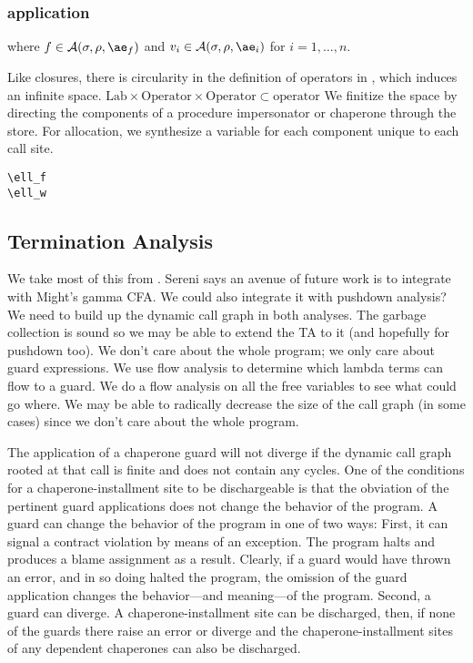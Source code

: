 \documentclass{sigplanconf}
\begin{document}
\subsubsection{application}

\noindent
{}

\noindent
where $f\in\A{\sigma}{\rho}{\ae_f}$ and $v_i\in\A{\sigma}{\rho}{\ae_i}$ for $i=1,\dots,n$.

Like closures, there is circularity in the definition of operators in \chapcalc, which induces an infinite space.
$\mathrm{Lab}\times\mathrm{Operator}\times\mathrm{Operator}\subset\mathrm{operator}$
We finitize the space by directing the components of a procedure impersonator or chaperone through the store.
For allocation, we synthesize a variable for each component unique to each call site.
\begin{verbatim}
\ell_f
\ell_w
\end{verbatim}

\subsection{Termination Analysis}

We take most of this from \cite{sereni2007termination}.
Sereni says an avenue of future work is to integrate with Might's gamma CFA.
We could also integrate it with pushdown analysis?
We need to build up the dynamic call graph in both analyses.
The garbage collection is sound so we may be able to extend the TA to it (and hopefully for pushdown too).
We don't care about the whole program; we only care about guard expressions.
We use flow analysis to determine which lambda terms can flow to a guard.
We do a flow analysis on all the free variables to see what could go where.
We may be able to radically decrease the size of the call graph (in some cases) since we don't care about the whole program.

The application of a chaperone guard will not diverge if the dynamic call graph rooted at that call is finite and does not contain any cycles.
One of the conditions for a chaperone-installment site to be dischargeable is that the obviation of the pertinent guard applications does not change the behavior of the program.
A guard can change the behavior of the program in one of two ways:
First, it can signal a contract violation by means of an exception.
The program halts and produces a blame assignment as a result.
Clearly, if a guard would have thrown an error, and in so doing halted the program, the omission of the guard application changes the behavior---and meaning---of the program.
Second, a guard can diverge.
A chaperone-installment site can be discharged, then, if none of the guards there raise an error or diverge and the chaperone-installment sites of any dependent chaperones can also be discharged.
\end{document}
